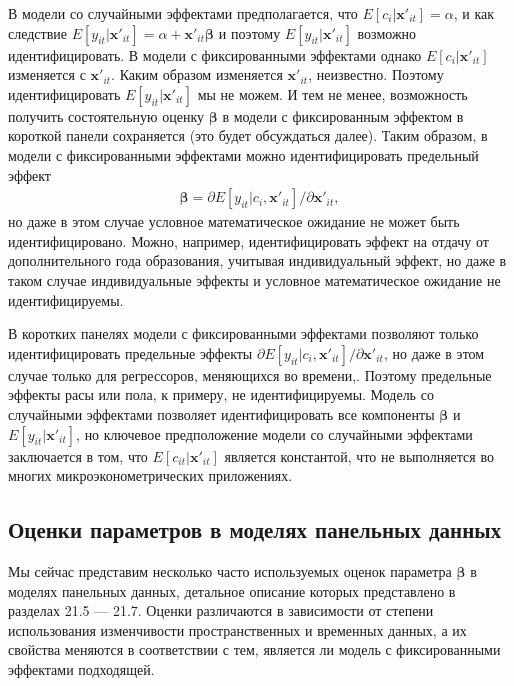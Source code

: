 В модели со случайными эффектами предполагается, что $E [c_i | \mathbf x'_{it}] = \alpha$, и как следствие $E[y_{it} | \mathbf x'_{it}] = \alpha + \mathbf x'_{it} \bm{\beta}$ и поэтому    
$E[y_{it} | \mathbf x'_{it}]$ возможно идентифицировать. В модели с фиксированными эффектами однако $E [c_i | \mathbf x'_{it}]$ изменяется с $\mathbf x'_{it}$. Каким образом изменяется $\mathbf x'_{it}$, неизвестно. Поэтому идентифицировать $E[y_{it} | \mathbf x'_{it}]$ мы не можем. И тем не менее, возможность получить состоятельную оценку $\bm{\beta}$ в модели с фиксированным эффектом в короткой панели сохраняется (это будет обсуждаться далее). Таким образом, в модели с фиксированными эффектами можно идентифицировать предельный эффект
\begin{align}
\bm{\beta} = \partial E[y_{it} | c_i, \mathbf x'_{it}]/ \partial \mathbf x'_{it},
\nonumber
\end{align}
но даже в этом случае условное математическое ожидание не может быть идентифицировано. Можно, например, идентифицировать эффект на отдачу от дополнительного года образования, учитывая индивидуальный эффект, но даже в таком случае индивидуальные эффекты и условное математическое ожидание не идентифицируемы.

В коротких панелях модели с фиксированными эффектами позволяют только идентифицировать  предельные эффекты $\partial E[y_{it} | c_i, \mathbf x'_{it}]/ \partial \mathbf x'_{it}$, но даже в этом случае только для регрессоров, меняющихся во времени,. Поэтому предельные эффекты расы или пола, к примеру, не идентифицируемы. Модель со случайными эффектами позволяет идентифицировать все компоненты $\bm{\beta}$ и $E[y_{it}| \mathbf x'_{it}]$, но ключевое предположение модели со случайными эффектами заключается в том, что $E[c_{it}| \mathbf x'_{it}]$ является константой, что не выполняется во многих микроэконометрических приложениях.

\subsection{Оценки параметров в моделях панельных данных}

Мы сейчас представим несколько часто используемых оценок параметра $\bm{\beta}$ в моделях панельных данных, детальное описание которых представлено в разделах 21.5 --- 21.7. Оценки различаются в зависимости от степени использования изменчивости пространственных и временных данных, а их свойства меняются в соответствии с тем, является ли модель с фиксированными эффектами подходящей.

